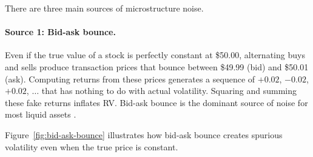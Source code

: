 There are three main sources of microstructure noise.

\paragraph{Source 1: Bid-ask bounce.}
Even if the true value of a stock is perfectly constant at \$50.00, alternating buys and sells produce transaction prices that bounce between \$49.99 (bid) and \$50.01 (ask).
Computing returns from these prices generates a sequence of $+0.02$, $-0.02$, $+0.02$, $\ldots$ that has nothing to do with actual volatility.
Squaring and summing these fake returns inflates RV.
Bid-ask bounce is the dominant source of noise for most liquid assets \citep{HansenLunde2006}.

Figure~\ref{fig:bid-ask-bounce} illustrates how bid-ask bounce creates spurious volatility even when the true price is constant.

